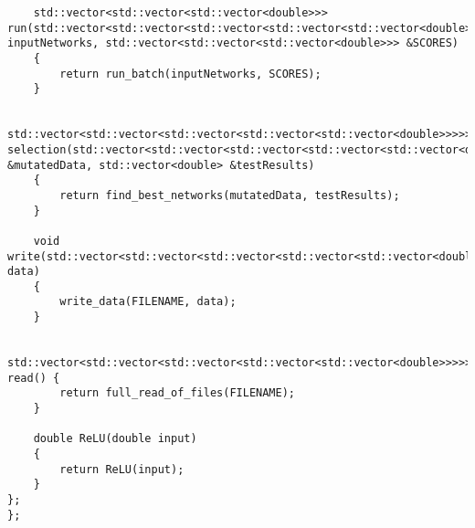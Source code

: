 \begin{verbatim}
    std::vector<std::vector<std::vector<double>>> run(std::vector<std::vector<std::vector<std::vector<std::vector<double>>>>> inputNetworks, std::vector<std::vector<std::vector<double>>> &SCORES)
    {
        return run_batch(inputNetworks, SCORES);
    }

    std::vector<std::vector<std::vector<std::vector<std::vector<double>>>>> selection(std::vector<std::vector<std::vector<std::vector<std::vector<double>>>>> &mutatedData, std::vector<double> &testResults)
    {
        return find_best_networks(mutatedData, testResults);
    }

    void write(std::vector<std::vector<std::vector<std::vector<std::vector<double>>>>> data)
    {
        write_data(FILENAME, data);
    }

    std::vector<std::vector<std::vector<std::vector<std::vector<double>>>>> read() {
        return full_read_of_files(FILENAME);
    }

    double ReLU(double input)
    {
        return ReLU(input);
    }
};
};
\end{verbatim}
